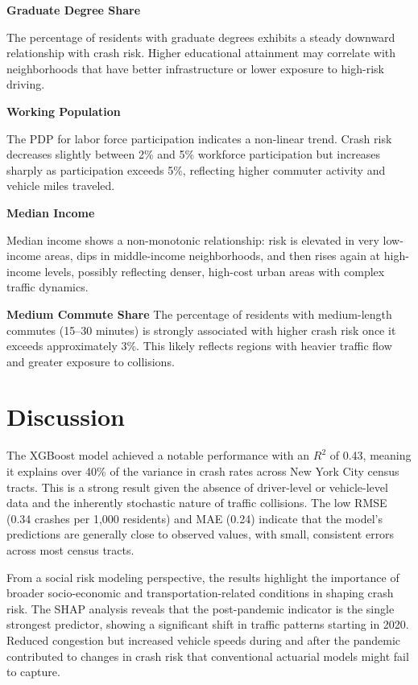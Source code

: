 \documentclass[
  number,
  review,
  3p]{elsarticle}
\begin{document}
\textbf{Graduate Degree Share}

The percentage of residents with graduate degrees exhibits a steady
downward relationship with crash risk. Higher educational attainment may
correlate with neighborhoods that have better infrastructure or lower
exposure to high-risk driving.

\textbf{Working Population}

The PDP for labor force participation indicates a non-linear trend.
Crash risk decreases slightly between 2\% and 5\% workforce
participation but increases sharply as participation exceeds 5\%,
reflecting higher commuter activity and vehicle miles traveled.

\textbf{Median Income}

Median income shows a non-monotonic relationship: risk is elevated in
very low-income areas, dips in middle-income neighborhoods, and then
rises again at high-income levels, possibly reflecting denser, high-cost
urban areas with complex traffic dynamics.

\textbf{Medium Commute Share} The percentage of residents with
medium-length commutes (15--30 minutes) is strongly associated with
higher crash risk once it exceeds approximately 3\%. This likely
reflects regions with heavier traffic flow and greater exposure to
collisions.

\section{Discussion}\label{discussion}

The XGBoost model achieved a notable performance with an \(R^2\) of
0.43, meaning it explains over 40\% of the variance in crash rates
across New York City census tracts. This is a strong result given the
absence of driver-level or vehicle-level data and the inherently
stochastic nature of traffic collisions. The low RMSE (0.34 crashes per
1,000 residents) and MAE (0.24) indicate that the model's predictions
are generally close to observed values, with small, consistent errors
across most census tracts.

From a social risk modeling perspective, the results highlight the
importance of broader socio-economic and transportation-related
conditions in shaping crash risk. The SHAP analysis reveals that the
post-pandemic indicator is the single strongest predictor, showing a
significant shift in traffic patterns starting in 2020. Reduced
congestion but increased vehicle speeds during and after the pandemic
contributed to changes in crash risk that conventional actuarial models
might fail to capture.
\end{document}
